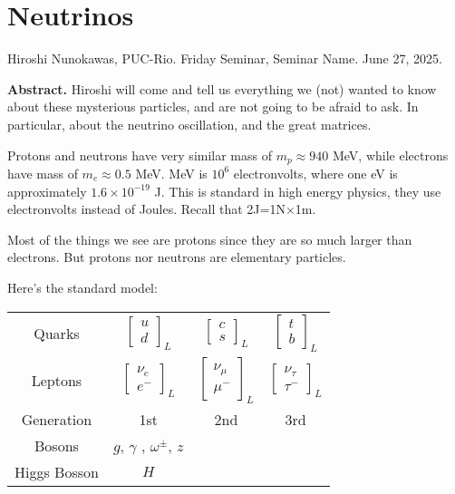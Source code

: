 \section{Neutrinos}
\label{section-neutrinos}

\noindent
Hiroshi Nunokawas, PUC-Rio.
Friday Seminar, Seminar Name. 
June 27, 2025.

\medskip
{\bf Abstract.} Hiroshi will come and tell us everything we (not) wanted to know
about these mysterious particles, and are not going to be afraid to ask. In
particular, about the neutrino oscillation, and the great matrices.

\bigskip\noindent

Protons and neutrons have very similar mass of $m_p\approx 940$ MeV, while
electrons have mass of $m_e \approx 0.5$ MeV. MeV is $10^{6}$ electronvolts,
where one eV is approximately $1.6\times 10^{-19}$ J. This is standard in high
energy physics, they use electronvolts instead of Joules. Recall that
2J=1N$\times$1m.

Most of the things we see are protons since they are so much larger than
electrons. But protons nor neutrons are elementary particles.

Here's the standard model:

\medskip

\begin{tabular}{c c c c}
Quarks & $\begin{bmatrix} u\\d \end{bmatrix}_L $ & $\begin{bmatrix} c\\s
\end{bmatrix}_L$ & $\begin{bmatrix} t\\b \end{bmatrix}_L$\\
Leptons & $\begin{bmatrix} \nu_e\\e^- \end{bmatrix}_L $ & $\begin{bmatrix}
\nu_\mu\\ \mu^-
\end{bmatrix}_L$ & $\begin{bmatrix} \nu_\tau\\ \tau^- \end{bmatrix}_L$\\
Generation & 1st & 2nd & 3rd\\
Bosons & $g$, $\gamma$ , $\omega^\pm$, $z$ \\
Higgs Bosson & $H$
\end{tabular}

